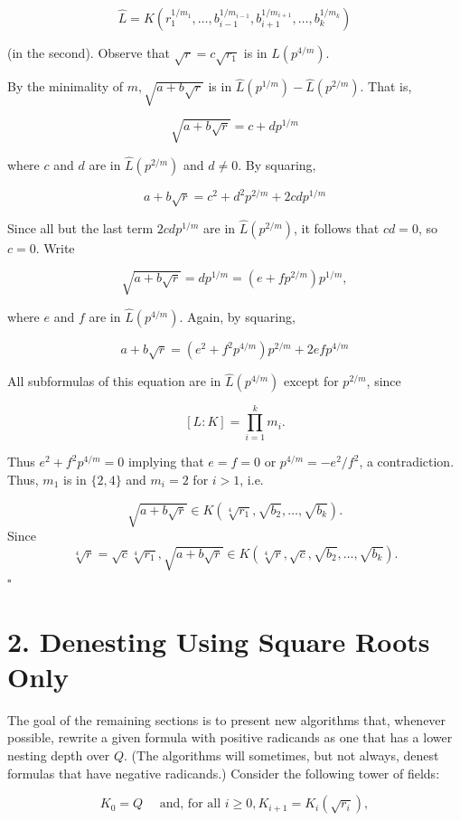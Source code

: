 \documentclass[11pt,letterpaper]{article}
\begin{document}
\[
\hat{L}=K\left(r_{1}^{1 / m_{1}}, \ldots, b_{i-1}^{1 / m_{i-1}}, b_{i+1}^{1 / m_{i+1}}, \ldots, b_{k}^{1 / m_{k}}\right)
\]

(in the second). Observe that $\sqrt{r}=c \sqrt{r_{1}}$ is in $\hat{L}\left(p^{4 / m}\right)$.

By the minimality of $m, \sqrt{a+b \sqrt{r}}$ is in $\hat{L}\left(p^{1 / m}\right)-\hat{L}\left(p^{2 / m}\right)$. That is,

\[
\sqrt{a+b \sqrt{r}}=c+d p^{1 / m}
\]

where $c$ and $d$ are in $\hat{L}\left(p^{2 / m}\right)$ and $d \neq 0$. By squaring,

\[
a+b \sqrt{r}=c^{2}+d^{2} p^{2 / m}+2 c d p^{1 / m}
\]

Since all but the last term $2 c d p^{1 / m}$ are in $\hat{L}\left(p^{2 / m}\right)$, it follows that $c d=0$, so $c=0$. Write

\[
\sqrt{a+b \sqrt{r}}=d p^{1 / m}=\left(e+f p^{2 / m}\right) p^{1 / m},
\]

where $e$ and $f$ are in $\hat{L}\left(p^{4 / m}\right)$. Again, by squaring,

\[
a+b \sqrt{r}=\left(e^{2}+f^{2} p^{4 / m}\right) p^{2 / m}+2 e f p^{4 / m}
\]

All subformulas of this equation are in $\hat{L}\left(p^{4 / m}\right)$ except for $p^{2 / m}$, since

\[
[L: K]=\prod_{i=1}^{k}m_i .
\]

Thus $e^{2}+f^{2} p^{4 / m}=0$ implying that $e=f=0$ or $p^{4 / m}=-e^{2} / f^{2}$, a contradiction. Thus, $m_{1}$ is in $\{2,4\}$ and $m_{i}=2$ for $i>1$, i.e.

\[
\sqrt{a+b \sqrt{r}} \in K\left(\sqrt[4]{r_{1}}, \sqrt{b_{2}}, \ldots, \sqrt{b_{k}}\right) .
\]
Since
\[
\sqrt[4]{r}=\sqrt{c} \sqrt[4]{r_{1}}, \sqrt{a+b \sqrt{r}} \in K\left(\sqrt[4]{r}, \sqrt{c}, \sqrt{b_{2}}, \ldots, \sqrt{b_{k}}\right) .
\] \(\square\)

\section*{2. Denesting Using Square Roots Only}
The goal of the remaining sections is to present new algorithms that, whenever possible, rewrite a given formula with positive radicands as one that has a lower nesting depth over $Q$. (The algorithms will sometimes, but not always, denest formulas that have negative radicands.) Consider the following tower of fields:

\[
K_{0}=Q \quad \text { and, for all } i \geqslant 0, K_{i+1}=K_{i}\left(\sqrt{r_{i}}\right),
\]
\end{document}
